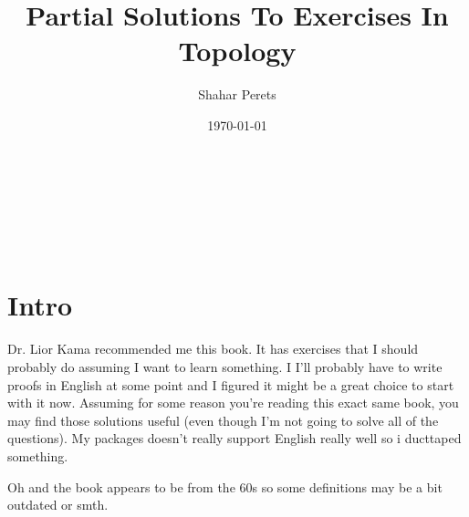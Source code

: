 \documentclass[a4paper]{article}
\author{Shahar Perets}
\title{Partial Solutions To Exercises In Topology}
\date{\today}
\newcommand\nsubsection[1]{\subsection*{#1}\addcontentsline{toc}{subsection}{#1}}
\begin{document}
	\huge {\huge\,\\ \vfil {\begin{center}
				\thetitle \\
				\vspace{10pt}
				\large \theauthor \\
				\vspace{3pt}
				\large \thedate
		\end{center}} \vfil	}
	\normalsize
	
	\pagebreak
	
	\section*{Intro}
	Dr. Lior Kama recommended me this book. It has exercises that I should probably do assuming I want to learn something. I I'll probably have to write proofs in English at some point and I figured it might be a great choice to start with it now. Assuming for some reason you're reading this exact same book, you may find those solutions useful (even though I'm not going to solve all of the questions). My packages doesn't really support English really well so i ducttaped something. 
	
	Oh and the book appears to be from the 60s so some definitions may be a bit outdated or smth. 
	
%	
	\tableofcontents
	
\end{document}
